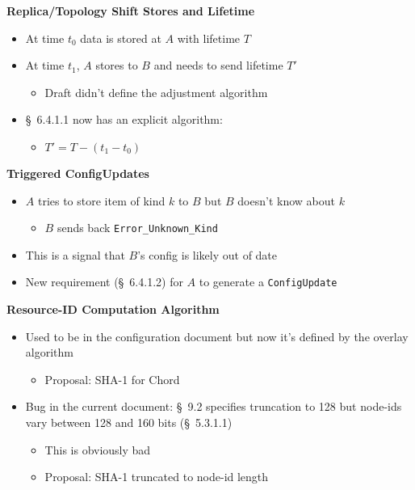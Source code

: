 \documentclass[helvetica]{seminar}
\newcommand{\heading}[1]{%
  \begin{center} 
    \large\bf 
    #1 
  \end{center} 
  \vspace{.4 in}}
\begin{document}
\begin{slide}
\heading{Replica/Topology Shift Stores and Lifetime}

\begin{itemize}
\item At time $t_0$ data is stored at $A$ with lifetime $T$ 
\item At time $t_1$, $A$ stores to $B$ and needs to send lifetime $T'$
  \begin{itemize}
  \item Draft didn't define the adjustment algorithm
  \end{itemize}
\item \S\ 6.4.1.1 now has an explicit algorithm:
  \begin{itemize}
    \item $T' = T - (t_1 - t_0)$
  \end{itemize}
\end{itemize}
\end{slide}



\begin{slide}
\heading{Triggered ConfigUpdates}

\begin{itemize}
\item $A$ tries to store item of kind $k$ to $B$ but $B$ doesn't know about $k$
  \begin{itemize}
  \item $B$ sends back \verb^Error_Unknown_Kind^
  \end{itemize}

\item This is a signal that $B$'s config is likely out of date
\item New requirement (\S\ 6.4.1.2) for $A$ to generate a \verb^ConfigUpdate^
\end{itemize}
\end{slide}


\begin{slide}
\heading{Resource-ID Computation Algorithm}

\begin{itemize}
\item Used to be in the configuration document but now it's defined by the overlay algorithm
  \begin{itemize}
  \item Proposal: SHA-1 for Chord
  \end{itemize}
\item Bug in the current document: \S\ 9.2 specifies truncation to 128 but node-ids vary between 128 and 160 bits (\S\ 5.3.1.1)
  \begin{itemize}
  \item This is obviously bad
  \item Proposal: SHA-1 truncated to node-id length
  \end{itemize}
\end{itemize}

\end{slide}
\end{document}
